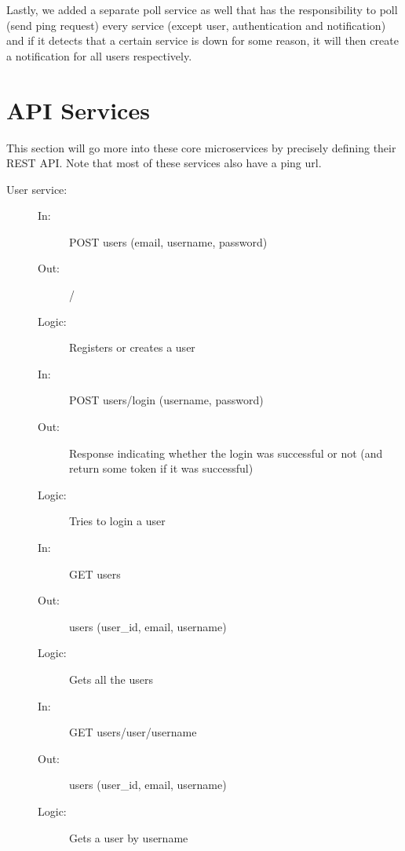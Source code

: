 \documentclass{article}
\begin{document}
Lastly, we added a separate poll service as well that has the responsibility to poll (send ping request) every service (except user, authentication and notification) and if it detects that a certain service is down for some reason, it will then create a notification for all users respectively.

\section{API Services}
\label{api}

This section will go more into these core microservices by precisely defining their REST API. Note that most of these services also have a ping url.

\begin{description}
    \item [User service:]
    \begin{description}
        \item[]
        \item[In:] POST users (email, username, password)
        \item[Out:] /
        \item[Logic:] Registers or creates a user
        \item[]
    \end{description}
    \begin{description}
        \item[In:] POST users/login (username, password)
        \item[Out:] Response indicating whether the login was successful or not (and return some token if it was successful)
        \item[Logic:] Tries to login a user
        \item[]
    \end{description}
    \begin{description}
        \item[In:] GET users
        \item[Out:] users (user\_id, email, username)
        \item[Logic:] Gets all the users
        \item[]
    \end{description}
    \begin{description}
        \item[In:] GET users/user/username
        \item[Out:] users (user\_id, email, username)
        \item[Logic:] Gets a user by username

\end{description}
\end{description}
\end{document}
